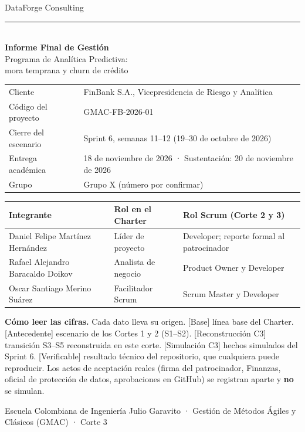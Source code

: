 \documentclass[10pt,a4paper]{article}
\newcommand{\rot}[1]{\textsf{\scriptsize\color{gris}[#1]}}
\begin{document}
\begin{titlepage}
\color{navy}
\vspace*{1.2cm}
{\large DataForge Consulting}\\[0.3em]
{\color{gris}\rule{\linewidth}{0.6pt}}\\[1.5cm]
{\fontsize{30}{36}\selectfont\bfseries Informe Final de Gestión}\\[0.6cm]
{\Large Programa de Analítica Predictiva:\\ mora temprana y churn de crédito}\\[1.2cm]
\color{black}
\begin{tabular}{@{}ll}
Cliente & FinBank S.A., Vicepresidencia de Riesgo y Analítica \\
Código del proyecto & GMAC-FB-2026-01 \\
Cierre del escenario & Sprint 6, semanas 11--12 (19--30 de octubre de 2026) \\
Entrega académica & 18 de noviembre de 2026 · Sustentación: 20 de noviembre de 2026 \\
Grupo & Grupo X (número por confirmar) \\
\end{tabular}

\vspace{1.2cm}
\begin{tabular}{@{}lll}
\textbf{Integrante} & \textbf{Rol en el Charter} & \textbf{Rol Scrum (Corte 2 y 3)} \\
\midrule
Daniel Felipe Martínez Hernández & Líder de proyecto & Developer; reporte formal al patrocinador \\
Rafael Alejandro Baracaldo Doikov & Analista de negocio & Product Owner y Developer \\
Oscar Santiago Merino Suárez & Facilitador Scrum & Scrum Master y Developer \\
\end{tabular}

\vfill
\begin{tcolorbox}[colback=navy!4,colframe=navy!40,boxrule=0.4pt,arc=1mm,left=2mm,right=2mm]
\small\textbf{Cómo leer las cifras.} Cada dato lleva su origen.
\rot{Base} línea base del Charter.
\rot{Antecedente} escenario de los Cortes 1 y 2 (S1--S2).
\rot{Reconstrucción C3} transición S3--S5 reconstruida en este corte.
\rot{Simulación C3} hechos simulados del Sprint 6.
\rot{Verificable} resultado técnico del repositorio, que cualquiera puede reproducir.
Los actos de aceptación reales (firma del patrocinador, Finanzas, oficial de protección de datos, aprobaciones en GitHub) se registran aparte y \textbf{no} se simulan.
\end{tcolorbox}
\vspace{0.4cm}
{\small Escuela Colombiana de Ingeniería Julio Garavito · Gestión de Métodos Ágiles y Clásicos (GMAC) · Corte 3}
\end{titlepage}
\end{document}
